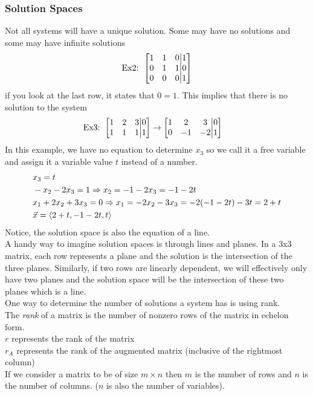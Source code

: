 \documentclass[11pt, fleqn]{article}
\begin{document}
\subsubsection{Solution Spaces}
Not all systems will have a unique solution. Some may have no solutions and some may have infinite solutions
\begin{align*}
    \text{Ex2: }\augmatrix{1&1&0\\0&1&1\\0&0&0}{1\\0\\1}
\end{align*}
if you look at the last row, it states that $0=1$. This implies that there is no solution to the system
\begin{align*}
    \text{Ex3: }&\augmatrix{1&2&3\\1&1&1}{0\\1}\to\augmatrix{1&2&3\\0&-1&-2}{0\\1}
\end{align*}
In this example, we have no equation to determine $x_3$ so we call it a free variable and assign it a variable value $t$ instead of a number.
\begin{align*}
    &x_3=t\\
    &-x_2-2x_3=1\Rightarrow x_2=-1-2x_3=-1-2t\\
    &x_1+2x_2+3x_3=0\Rightarrow x_1=-2x_2-3x_3=-2(-1-2t)-3t=2+t\\
    &\vec{x}=\left\langle 2+t,-1-2t,t \right\rangle
\end{align*}
Notice, the solution space is also the equation of a line.\\
A handy way to imagine solution spaces is through lines and planes. In a 3x3 matrix, each row represents a plane and the solution is the intersection of the three planes. Similarly, if two rows are linearly dependent, we will effectively only have two planes and the solution space will be the intersection of these two planes which is a line.\\
One way to determine the number of solutions a system has is using rank.\\
The \textit{rank} of a matrix is the number of nonzero rows of the matrix in echelon form.\\
$r$ represents the rank of the matrix\\
$r_A$ represents the rank of the augmented matrix (inclusive of the rightmost column)\\
If we consider a matrix to be of size $m\times n$ then $m$ is the number of rows and $n$ is the number of columns. ($n$ is also the number of variables).
\end{document}
